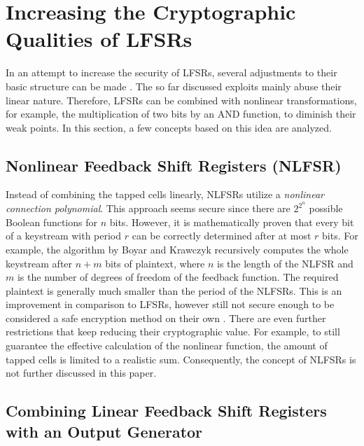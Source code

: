
\section{Increasing the Cryptographic Qualities of LFSRs}

In an attempt to increase the security of LFSRs, several adjustments to their basic structure can be made \cite[p. 97]{Pommerening.2000}. The so far discussed exploits mainly abuse their linear nature. Therefore, LFSRs can be combined with nonlinear transformations, for example, the multiplication of two bits by an AND function, to diminish their weak points. In this section, a few concepts based on this idea are analyzed.

\subsection{Nonlinear Feedback Shift Registers (NLFSR)}

Instead of combining the tapped cells linearly, NLFSRs utilize a \emph{nonlinear connection polynomial}. This approach seems secure since there are $2^{2^n}$ possible Boolean functions for $n$ bits. However, it is mathematically proven that every bit of a keystream with period $r$ can be correctly determined after at most $r$ bits. For example, the algorithm by Boyar and Krawczyk recursively computes the whole keystream after $n+m$ bits of plaintext, where $n$ is the length of the NLFSR and $m$ is the number of degrees of freedom of the feedback function. The required plaintext is generally much smaller than the period of the NLFSRs. This is an improvement in comparison to LFSRs, however still not secure enough to be considered a safe encryption method on their own \cite[p. 97]{Pommerening.2000}. There are even further restrictions that keep reducing their cryptographic value. For example, to still guarantee the effective calculation of the nonlinear function, the amount of tapped cells is limited to a realistic sum. \cite{Pommerening.2015} Consequently, the concept of NLFSRs is not further discussed in this paper.  \\

\subsection{Combining Linear Feedback Shift Registers with an Output Generator}

